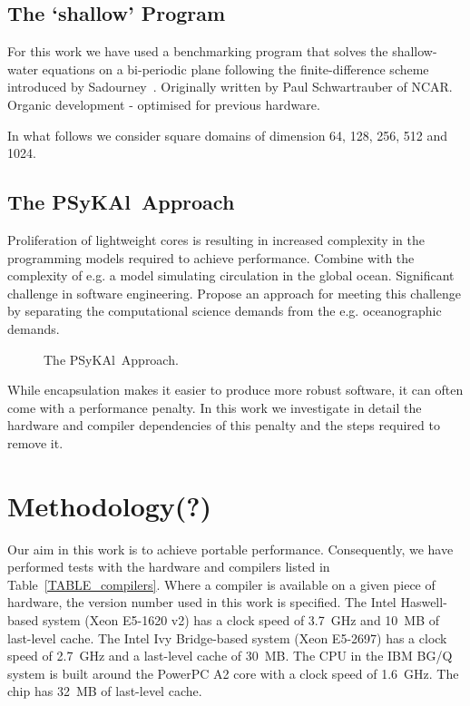 \documentclass[journal]{IEEEtran}
\newcommand{\psykal}{{PS}y{KA}l\ }
\begin{document}
\subsection{The `shallow' Program}
For this work we have used a benchmarking program that solves the
shallow-water equations on a bi-periodic plane following the
finite-difference scheme introduced by Sadourney~\cite{sadourny75}.
Originally written by Paul Schwartrauber of NCAR.  Organic development
- optimised for previous hardware.

In what follows we consider square domains of dimension 64, 128, 256,
512 and 1024.


\subsection{The \psykal Approach}
Proliferation of lightweight cores is resulting in increased
complexity in the programming models required to achieve performance.
Combine with the complexity of e.g. a model simulating circulation in
the global ocean. Significant challenge in software engineering.
Propose an approach for meeting this challenge by separating the
computational science demands from the e.g. oceanographic demands.

\begin{figure}
\centering
\caption{The \psykal Approach.}
\end{figure}

While encapsulation makes it easier to produce more robust software,
it can often come with a performance penalty. In this work we
investigate in detail the hardware and compiler dependencies of this
penalty and the steps required to remove it.

\section{Methodology(?)}

Our aim in this work is to achieve portable performance. Consequently,
we have performed tests with the hardware and compilers listed in
Table~\ref{TABLE_compilers}. Where a compiler is available on a given
piece of hardware, the version number used in this work is specified.
The Intel Haswell-based system (Xeon E5-1620 v2) has a clock speed of
3.7~GHz and 10~MB of last-level cache. The Intel Ivy Bridge-based
system (Xeon E5-2697) has a clock speed of 2.7~GHz and a last-level
cache of 30~MB. The CPU in the IBM BG/Q system is built around the
PowerPC A2 core with a clock speed of 1.6~GHz. The chip has 32~MB of
last-level cache.
\end{document}
